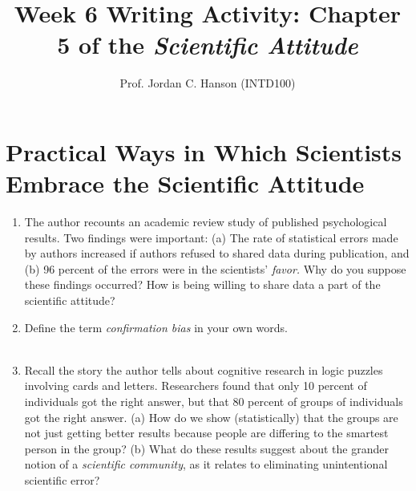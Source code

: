 \documentclass{article}
\begin{document}
\title{Week 6 Writing Activity: Chapter 5 of the \textit{Scientific Attitude}}
\author{Prof. Jordan C. Hanson (INTD100)}

\maketitle

\section{Practical Ways in Which Scientists Embrace the Scientific Attitude}

\begin{enumerate}
\item The author recounts an academic review study of published psychological results.  Two findings were important: (a) The rate of statistical errors made by authors increased if authors refused to shared data during publication, and (b) 96 percent of the errors were in the scientists' \textit{favor.}  Why do you suppose these findings occurred?  How is being willing to share data a part of the scientific attitude? \\ \vspace{3cm}
\item Define the term \textit{confirmation bias} in your own words. \\ \vspace{1cm} \\
\item Recall the story the author tells about cognitive research in logic puzzles involving cards and letters.  Researchers found that only 10 percent of individuals got the right answer, but that 80 percent of groups of individuals got the right answer.  (a) How do we show (statistically) that the groups are not just getting better results because people are differing to the smartest person in the group? (b) What do these results suggest about the grander notion of a \textit{scientific community}, as it relates to eliminating unintentional scientific error?

\end{enumerate}
\end{document}
